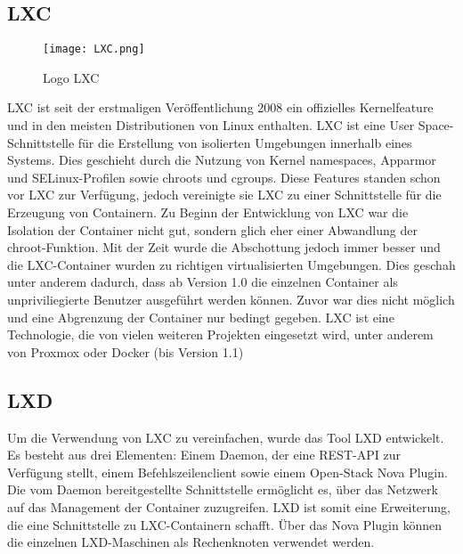 \subsection*{\ac{LXC}}
\label{sec:LXC}
\begin{wrapfigure}{r}{0.4\textwidth}
	\vspace{-40pt}
	\begin{center}
		\texttt{[image: LXC.png]}
	\end{center}
	\vspace{-15pt}
	\caption[Logo \ac{LXC}]{Logo \ac{LXC} \footnotemark}
	\label{fig:LXC}
	\vspace{-30pt}
\end{wrapfigure}
\ac{LXC} ist seit der erstmaligen Veröffentlichung 2008 ein offizielles Kernelfeature und in den meisten Distributionen von Linux enthalten. \ac{LXC} ist eine User Space-Schnittstelle für die Erstellung von isolierten Umgebungen innerhalb eines Systems. Dies geschieht durch die Nutzung von Kernel namespaces, Apparmor und SELinux-Profilen sowie chroots und cgroups. Diese Features standen schon vor \ac{LXC} zur Verfügung, jedoch vereinigte sie \ac{LXC} zu einer Schnittstelle für die Erzeugung von Containern. Zu Beginn der Entwicklung von \ac{LXC} war die Isolation der Container nicht gut, sondern glich eher einer Abwandlung der chroot-Funktion. Mit der Zeit wurde die Abschottung jedoch immer besser und die \ac{LXC}-Container wurden zu richtigen virtualisierten Umgebungen. Dies geschah unter anderem dadurch, dass ab Version 1.0 die einzelnen Container als unpriviliegierte Benutzer ausgeführt werden können. Zuvor war dies nicht möglich und eine Abgrenzung der Container nur bedingt gegeben. \ac{LXC} ist eine Technologie, die von vielen weiteren Projekten eingesetzt wird, unter anderem von Proxmox oder Docker (bis Version 1.1)\citep{IEEE7036275, IEEE7185212, IEEE7571957,IEEE7929714,LXCHomepage}


\subsection*{LXD}
\label{sec:lxd}

Um die Verwendung von \ac{LXC} zu vereinfachen, wurde das Tool LXD entwickelt. Es besteht aus drei Elementen: Einem Daemon, der eine REST-API zur Verfügung stellt, einem Befehlszeilenclient sowie einem Open-Stack Nova Plugin. Die vom Daemon bereitgestellte Schnittstelle ermöglicht es, über das Netzwerk auf das Management der Container zuzugreifen. LXD ist somit eine Erweiterung, die eine Schnittstelle zu \ac{LXC}-Containern schafft. Über das Nova Plugin können die einzelnen LXD-Maschinen als Rechenknoten verwendet werden. \citep{LXDHomepage}

